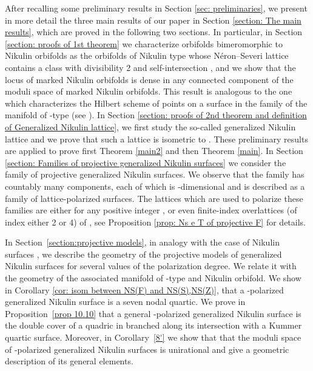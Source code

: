 \documentclass{amsart}
\makeatletter
\theoremstyle{definition}
\numberwithin{equation}{section}
\numberwithin{equation}{section} \theoremstyle{definition}
\newcounter{mathrecordid}
\newcommand{\mathboxbegin}[1]{%
  \stepcounter{mathrecordid}%
  \immediate\write\mathrecords{\themathrecordid,#1}%
  \special{pdf:bann << /Type /Annot /Subtype /Link /Border [0 0 0]
    /MathBoxID \themathrecordid /F 2
    /A << /S /URI /URI (urn:mathbox:\themathrecordid) >> >>}}
\newcommand{\mathboxinlineplain}[1]{$#1$}
\newcommand{\mathboxinline}[1]{%
  $\mathboxbegin{inline}#1\special{pdf:eann}$}
\newcommand{\recordmath}{%
  \ifmeasuring@\expandafter\mathboxinlineplain
  \else\expandafter\mathboxinline\fi}
\makeatother
\begin{document}
After recalling some preliminary results in Section \ref{sec: preliminaries}, we present in more detail the three main results of our paper in Section \ref{section: The main results}, which are proved in the following two sections. In particular, in Section \ref{section: proofs of 1st theorem} we characterize orbifolds bimeromorphic to Nikulin orbifolds as the orbifolds of Nikulin type whose N\'eron--Severi lattice contains a class with divisibility 2 and self-intersection \recordmath{-4}, and we show that the locus of marked Nikulin orbifolds is dense in any connected component of the moduli space of marked Nikulin orbifolds. This result is analogous to the one which characterizes the Hilbert scheme of points on a \recordmath{K3} surface in the family of the manifold of \recordmath{K3^{[2]}}-type (see \cite[Theorem 1.1]{MarkmanMehrotra}). In Section \ref{section: proofs of 2nd theorem and definition of Generalized Nikulin lattice}, we first study the so-called generalized Nikulin lattice and 
we prove that such a lattice is isometric to \recordmath{E_7(-2)}. These preliminary results are applied to prove first Theorem \ref{main2} and then Theorem \ref{main}. 
In Section \ref{section: Families of projective generalized Nikulin surfaces} we consider the family of projective generalized Nikulin surfaces.  
We observe that the family has countably many components, each of which is \recordmath{12}-dimensional and is described as a family of lattice-polarized \recordmath{K3} surfaces. The lattices which are used to polarize these families are either \recordmath{\langle 2d\rangle\oplus E_7(-2)} for any positive integer \recordmath{d}, or even finite-index overlattices (of index either 2 or 4) of \recordmath{\langle 2d\rangle\oplus E_7(-2)}, see Proposition \ref{prop: Ns e T of projective F} for details.


In Section~\ref{section:projective models}, in analogy with the case of Nikulin
surfaces \cite{FV, vGS, GS, V}, we describe the geometry of the projective models
of generalized Nikulin surfaces for several values of the polarization degree. We
relate it with the geometry of the associated manifold of \recordmath{K3^{[2]}}-type and Nikulin
orbifold. We show
in Corollary \ref{cor: isom between NS(F) and NS(S),NS(Z)}, that a \recordmath{(\langle 2\rangle\oplus E_7(-2))}-polarized generalized Nikulin surface is a seven nodal quartic.
We prove in Proposition~\ref{prop 10.10} that a general
\recordmath{(\langle 4\rangle\oplus E_7(-2))'}-polarized generalized Nikulin surface is the
double cover of a quadric in \recordmath{\mathbb{P}^3} branched along its intersection with a
Kummer quartic surface. Moreover, in Corollary~\ref{8'} we show that that the moduli space of
\recordmath{(\langle 8\rangle \oplus E_7(-2))'}-polarized generalized Nikulin surfaces is
unirational and give a geometric description of its general elements.
\end{document}
